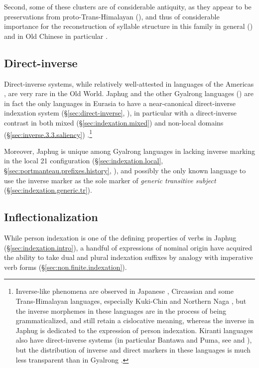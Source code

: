  Second, some of these clusters are of considerable antiquity, as they appear to be preservations from proto-Trans-Himalayan (\citealt{jacques15sr,zhangsy19cognates}), and thus of considerable importance for the reconstruction of syllable structure in this family in general (\citealt[212]{hill2019phonology}) and in Old Chinese in particular \citep{gong17clusters}.
 
\subsection{Direct-inverse}
Direct-inverse systems, while relatively well-attested in languages of the Americas \citep{zuniga06}, are very rare in the Old World. Japhug and the other Gyalrong languages (\citealt{delancey81direction, jackson02rentongdengdi, jacques10inverse, gongxun14agreement}) are in fact the only languages in Eurasia to have a near-canonical direct-inverse indexation system (§\ref{sec:direct-inverse}, \citealt{jacques14inverse}), in particular with a direct-inverse contrast in both mixed (§\ref{sec:indexation.mixed}) and non-local domains (§\ref{sec:inverse.3.3.saliency})
.\footnote{Inverse-like phenomena are observed in Japanese \citep{koga2008}, Circassian \citep{arkadiev17inverse} and some Trans-Himalayan languages, especially Kuki-Chin and Northern Naga \citep{konnerth19agreement}, but the inverse morphemes in these languages are in the process of being grammaticalized, and still retain a cislocative meaning, whereas the inverse  in Japhug is dedicated to the expression of person indexation.  Kiranti languages also have direct-inverse systems (in particular Bantawa and Puma, see \citealt{doornenbal09} and \citealt{bickel07puma}), but the distribution of inverse and direct markers in these languages is much less transparent than in Gyalrong \citep{jacques14inverse}.   }

Moreover, Japhug is unique among Gyalrong languages in lacking inverse marking in the local 2\fl{}1 configuration (§\ref{sec:indexation.local}, §\ref{sec:portmanteau.prefixes.history}, \citealt{jacques18generic}),  and possibly the only known language to use the inverse marker as the sole marker of \textit{generic transitive subject}  (§\ref{sec:indexation.generic.tr}). 
  
 
\subsection{Inflectionalization} \label{sec:inflectionalization.intro}
While person indexation is one of the defining properties of verbs in Japhug (§\ref{sec:indexation.intro}), a handful of expressions of nominal origin have acquired the ability to take dual  and plural  indexation suffixes by analogy with imperative verb forms (§\ref{sec:non.finite.indexation}). 

